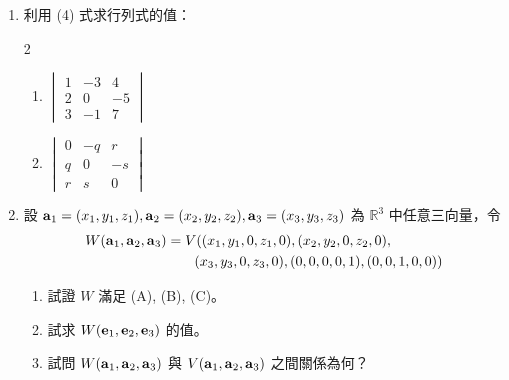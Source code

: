 \begin{enumerate}[label=\arabic*., leftmargin=2em]
  \item 利用 (4) 式求行列式的值：
  \begin{multicols}{2}
  \begin{enumerate}[label=(\roman*)]
    \item $\begin{vmatrix} 1 & -3 & 4 \\ 2 & 0 & -5 \\ 3 & -1 & 7 \end{vmatrix}$
    \item $\begin{vmatrix} 0 & -q & r \\ q & 0 & -s \\ r & s & 0 \end{vmatrix}$
  \end{enumerate}
  \end{multicols}

  \item[\textbf{**2.}] 設 $\boldsymbol{\mathbf{a}}_1=(x_1, y_1, z_1), \boldsymbol{\mathbf{a}}_2=(x_2, y_2, z_2), \boldsymbol{\mathbf{a}}_3=(x_3, y_3, z_3)$ 為 $\mathbb{R}^3$ 中任意三向量，令
  \begin{align*}
  W(\boldsymbol{\mathbf{a}}_1, \boldsymbol{\mathbf{a}}_2, \boldsymbol{\mathbf{a}}_3) &= V((x_1, y_1, 0, z_1, 0), (x_2, y_2, 0, z_2, 0), \\
  &\qquad (x_3, y_3, 0, z_3, 0), (0, 0, 0, 0, 1), (0, 0, 1, 0, 0))
  \end{align*}
  \begin{enumerate}[label=(\roman*)]
    \item 試證 $W$ 滿足 (A), (B), (C)。
    \item 試求 $W(\boldsymbol{\mathbf{e}}_1, \boldsymbol{\mathbf{e}}_2, \boldsymbol{\mathbf{e}}_3)$ 的值。
    \item 試問 $W(\boldsymbol{\mathbf{a}}_1, \boldsymbol{\mathbf{a}}_2, \boldsymbol{\mathbf{a}}_3)$ 與 $V(\boldsymbol{\mathbf{a}}_1, \boldsymbol{\mathbf{a}}_2, \boldsymbol{\mathbf{a}}_3)$ 之間關係為何？
  \end{enumerate}


\end{enumerate}
